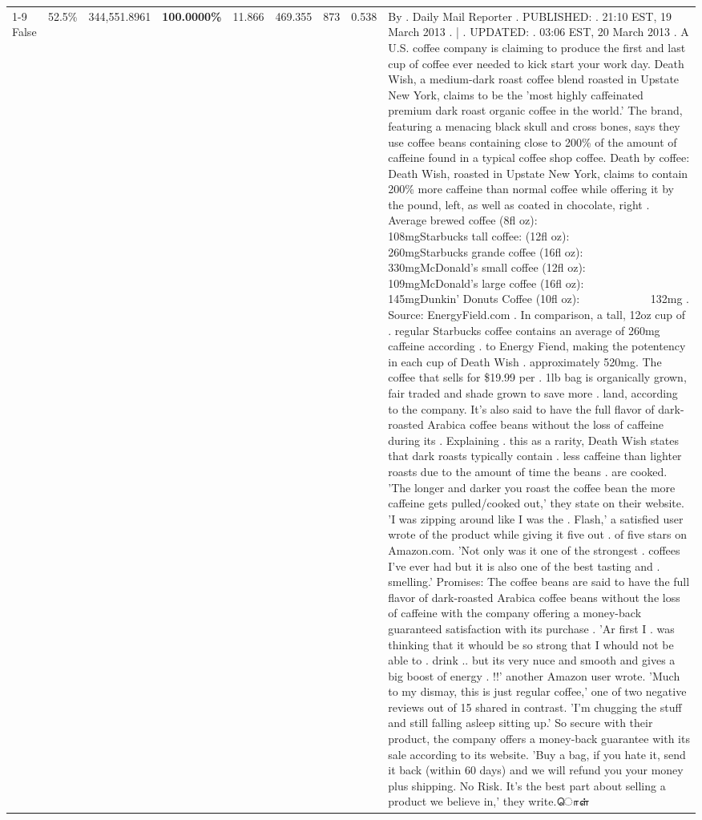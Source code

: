 \begin{table}[H]
{\begin{tabular}{lllrlllll}
\cline{1-9}
False & 52.5\% & 344,551.8961 & \bfseries \color{red} 100.0000\% & 11.866 & 469.355 & 873 & 0.538 & By . Daily Mail Reporter . PUBLISHED: . 21:10 EST, 19 March 2013 . | . UPDATED: . 03:06 EST, 20 March 2013 . A U.S. coffee company is claiming to produce the first and last cup of coffee ever needed to kick start your work day. Death Wish, a medium-dark roast coffee blend roasted in Upstate New York, claims to be the 'most highly caffeinated premium dark roast organic coffee in the world.' The brand, featuring a menacing black skull and cross bones, says they use coffee beans containing close to 200\% of the amount of caffeine found in a typical coffee shop coffee. Death by coffee: Death Wish, roasted in Upstate New York, claims to contain 200\% more caffeine than normal coffee while offering it by the pound, left, as well as coated in chocolate, right . Average brewed coffee (8fl oz):              108mgStarbucks tall coffee: (12fl oz):                260mgStarbucks grande coffee (16fl oz):         330mgMcDonald's small coffee (12fl oz):           109mgMcDonald's large coffee (16fl oz):           145mgDunkin' Donuts Coffee (10fl oz):             132mg . Source: EnergyField.com . In comparison, a tall, 12oz cup of . regular Starbucks coffee contains an average of 260mg caffeine according . to Energy Fiend, making the potentency in each cup of Death Wish . approximately 520mg. The coffee that sells for \$19.99 per . 1lb bag is organically grown, fair traded and shade grown to save more . land, according to the company. It's also said to have the full flavor of dark-roasted Arabica coffee beans without the loss of caffeine during its . Explaining . this as a rarity, Death Wish states that dark roasts typically contain . less caffeine than lighter roasts due to the amount of time the beans . are cooked. 'The longer and darker you roast the coffee bean the more caffeine gets pulled/cooked out,' they state on their website. 'I was zipping around like I was the . Flash,' a satisfied user wrote of the product while giving it five out . of five stars on Amazon.com. 'Not only was it one of the strongest . coffees I've ever had but it is also one of the best tasting and . smelling.’ Promises: The coffee beans are said to have the full flavor of dark-roasted Arabica coffee beans without the loss of caffeine with the company offering a money-back guaranteed satisfaction with its purchase . 'Ar first I . was thinking that it whould be so strong that I whould not be able to . drink .. but its very nuce and smooth and gives a big boost of energy . !!' another Amazon user wrote. 'Much to my dismay, this is just regular coffee,' one of two negative reviews out of 15 shared in contrast. 'I'm chugging the stuff and still falling asleep sitting up.' So secure with their product, the company offers a money-back guarantee with its sale according to its website. 'Buy a bag, if you hate it, send it back (within 60 days) and we will refund you your money plus shipping. No Risk. It’s the best part about selling a product we believe in,' they write.ொள் \\

\end{tabular}}
\end{table}
